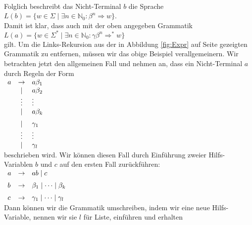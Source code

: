 \\[0.2cm]
Folglich beschreibt das Nicht-Terminal $b$ die Sprache
\\[0.2cm]
\hspace*{1.3cm} $L(b) = \bigl\{ w \in \Sigma \mid \exists n \in \mathbb{N}_0: \beta^n \Rightarrow w
\bigr\}$.
\\[0.2cm]
Damit ist klar, dass auch mit der oben angegeben Grammatik
\\[0.2cm]
\hspace*{1.3cm} $L(a) = \bigl\{ w \in \Sigma^* \mid \exists n \in \mathbb{N}_0: \gamma \beta^n
\Rightarrow^* w \bigr\}$
\\[0.2cm]
gilt.  Um die Links-Rekursion aus der in Abbildung \ref{fig:Expr} auf Seite \pageref{fig:Expr}
gezeigten Grammatik zu entfernen, m\"ussen wir das obige Beispiel verallgemeinern.  Wir betrachten
jetzt den allgemeinen Fall und nehmen an, dass ein Nicht-Terminal $a$ durch Regeln der Form
\\[0.2cm]
\hspace*{1.3cm} $
\begin{array}[t]{lcl}
a & \rightarrow & a \beta_1 \\
  & \mid        & a \beta_2 \\
  & \vdots      & \vdots    \\
  & \mid        & a \beta_k \\[0.2cm]
  & \mid        & \gamma_1  \\
  & \vdots      & \vdots    \\
  & \mid        & \gamma_l
\end{array}
$
\\[0.2cm]
beschrieben wird.  Wir k\"onnen diesen Fall durch Einf\"uhrung zweier Hilfs-Variablen $b$ und $c$ auf
den ersten Fall zur\"uckf\"uhren:
\\[0.2cm]
\hspace*{1.3cm}
$
\begin{array}[t]{lcl}
a & \rightarrow & a b \mid c                         \\[0.2cm]
b & \rightarrow & \beta_1 \mid \cdots \mid \beta_k   \\[0.2cm]
c & \rightarrow & \gamma_1 \mid \cdots \mid \gamma_l
\end{array}
$
\\[0.2cm]
Dann k\"onnen wir die Grammatik umschreiben, indem wir eine neue Hilfs-Variable, nennen wir sie $l$
f\"ur Liste, einf\"uhren und erhalten
\\[0.2cm]
\hspace*{1.3cm}
